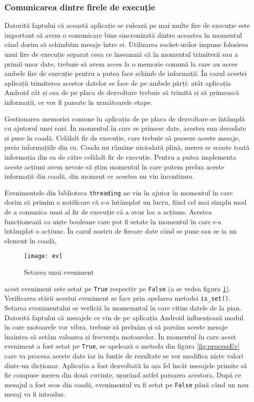 \documentclass[../IoMusT.tex]{subfiles}
\begin{document}
\subsubsection{Comunicarea dintre firele de execuție} 
Datorită faptului că această aplicație se rulează pe mai multe fire de execuție este important să avem o comunicare bine sincronizată dintre aceastea în momentul cănd dorim să schimbăm mesaje între ei. Utilizarea socket-urilor impune folosirea unui fire de execuție separat ceea ce înseamnă că în momentul trimiterii sau a primii unor date, trebuie să avem acces la o memorie comună la care au acces ambele fire de execuție pentru a putea face schimb de informații. În cazul acestei aplicații trimiterea acestor datelor se face de pe ambele părți: atât aplicația Android cât și cea de pe placa de dezvoltare trebuie să trimită și să primească informații, ce vor fi parsate în următoarele etape.
\\
\par Gestionarea memoriei comune în aplicația de pe placa de dezvoltare se întâmplă cu ajutorul unei cozi. În momentul în care se primesc date, acestea sun decodate și puse în coadă. Celălalt fir de execuție, care trebuie să parseze aceste mesaje, preia informațiile din ea. Coada nu râmăne niciodată plină, mereu se scoate toată informația din ea de către celălalt fir de execuție. Pentru a putea implementa aceste acțiuni avem nevoie să știm momentul în care putem prelua aceste informații din coadă, din moment ce acestea nu vin încontinuu.
\\
\par Evenimentele din biblioteca \verb|threading| ne vin în ajutor în momentul în care dorim să primim o notificare că s-a întâmplat un lucru, fiind cel mai simplu mod de a comunica unui al fir de execuție că a avur loc a acțiune. Acestea funcționează ca niște booleane care pot fi setate în momentul în care s-a întâmplat o acțiune. În cazul nostru de fiecare date cănd se pune sau se ia un element în coadă,
\begin{figure}[h]
\centering
\texttt{[image: ev]}
\caption{Setarea unui eveniment}
\label{fig:ev}
\end{figure}  
 acest eveniment este setat pe \verb|True| respectiv pe \verb|False|  (a se vedea figura \ref{fig:ev}).
 Verificarea stării acestui eveniment se face prin apelarea metodei \verb|is_set()|.
Setarea evenimentului se verficiă în momemntul în care citim datele de la pian. Datorită faptului că mesajele ce vin de pe aplicația Android influențează modul în care motoarele vor vibra, trebuie să preluăm și să parsăm aceste mesaje înaintea să setâm valoarea și frecvența motoarelor. În momentul în care acest eveniment a fost setat pe \verb|True|, se apelează o metoda din figura \ref{fig:processEv} care va procesa aceste date iar în funție de rezultate se vor modifica niște valori dintr-un dicționar. Aplicația a fost dezvoltată în așa fel încât mesajele primite să fie compuse mereu din două cuvinte, ușurând astfel parsarea acestora. După ce mesajul a fost scos din coadă, evenimentul va fi setat pe \verb|False| până când un nou mesaj va fi introdus.
\end{document}
